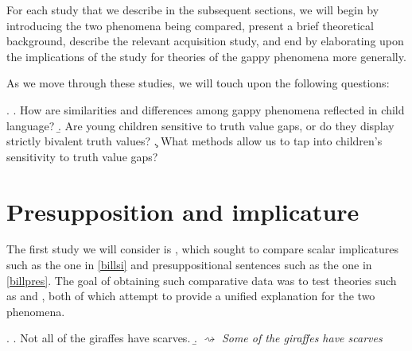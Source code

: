 \documentclass[12pt, letterpaper]{article}
\newcommand{\nbJR}[1]{\textcolor{magenta}{{\scriptsize#1}}}
\newcommand{\nbFS}[1]{\textcolor{red}{{\scriptsize#1}}}
\begin{document}
For each study that we describe in the subsequent sections, we will begin by introducing the two phenomena being compared, present a brief theoretical background, describe the relevant acquisition study, and end by elaborating upon the implications of the study for theories of the gappy phenomena more generally.

As we move through these studies, we will touch upon the following questions:

\ex.\label{questions}
\a. How are similarities and differences among gappy phenomena reflected in child language?
\b. Are young children sensitive to truth value gaps, or do they display strictly bivalent truth values?
\c. What methods allow us to tap into children's sensitivity to truth value gaps?


\section{Presupposition and implicature}

The first study we will consider is \cite*{Bill:2014b}, which sought to compare scalar implicatures such as the one in \ref{billsi} and presuppositional sentences such as the one in \ref{billpres}. The goal of obtaining such comparative data was to test theories such as \cite{Chemla:2009} and \cite{Romoli:2014}, both of which attempt to provide a unified explanation for the two phenomena. 

\ex. \label{billsi} \a. \label{sen:dsi1} Not all of the giraffes have scarves. 
\b. \label{inf:dsi1} $\rightsquigarrow$ \textit{Some of the giraffes have scarves} 
\end{document}
